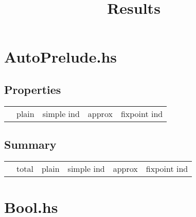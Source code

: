 \documentclass{article}
\begin{document}
\title{Results}
\maketitle

\section*{AutoPrelude.hs}
\subsection*{Properties}
\begin{longtable}{p{10cm} || c | c | c | c | }
  & plain & simple ind & approx & fixpoint ind \\
\end{longtable}

\subsection*{Summary}
\begin{longtable}{p{4cm} || c | c | c | c | c | }
  & total & plain & simple ind & approx & fixpoint ind \\
\end{longtable}

\section*{Bool.hs}
\end{document}

